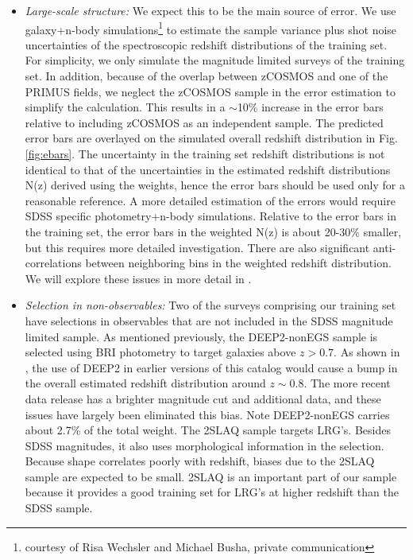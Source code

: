 \documentclass{emulateapj}
\begin{document}
\begin{itemize}

\item {\it Large-scale structure:} We expect this to be the main source of
error.  We use galaxy+n-body simulations\footnote{courtesy of Risa Wechsler and
Michael Busha, private communication} to estimate the sample variance plus shot
noise uncertainties of the spectroscopic redshift distributions of the training
set.  For simplicity, we only simulate the magnitude limited surveys of the
training set.  In addition, because of the overlap between zCOSMOS and one of
the PRIMUS fields, we neglect the zCOSMOS sample in the error estimation to
simplify the calculation.  This results in a $\sim$10\% increase in the error
bars relative to including zCOSMOS as an independent sample.  The predicted
error bars are overlayed on the simulated overall redshift distribution in Fig.
\ref{fig:ebars}.  The uncertainty in the training set redshift distributions is
not identical to that of the uncertainties in the estimated redshift
distributions N(z) derived using the weights, hence the error bars should be
used only for a reasonable reference.  A more detailed estimation of the errors
would require SDSS specific photometry+n-body simulations.  Relative to the
error bars in the training set, the error bars in the weighted N(z) is about
20-30\% smaller, but this requires more detailed investigation.  There are also
significant anti-correlations between neighboring bins in the weighted redshift
distribution.  We will explore these issues in more detail in
\citet{CunhaPhotozLSS11}.

\item {\it Selection in non-observables:} Two of the surveys comprising our
training set have selections in observables that are not included in the SDSS
magnitude limited sample.  As mentioned previously, the DEEP2-nonEGS sample is
selected using BRI photometry to target galaxies above $z>0.7$.  As shown in
\citet{CunhaPhotoz09}, the use of DEEP2 in earlier versions of this catalog
would cause a bump in the overall estimated redshift distribution around $z\sim
0.8$.  The more recent data release has a brighter magnitude cut and additional
data, and these issues have largely been eliminated this bias.  Note
DEEP2-nonEGS carries about 2.7\% of the total weight.  The 2SLAQ sample targets
LRG's.  Besides SDSS magnitudes, it also uses morphological information in the
selection.  Because shape correlates poorly with redshift, biases due to the
2SLAQ sample are expected to be small.  2SLAQ is an important part of our
sample because it provides a good training set for LRG's at higher redshift
than the SDSS sample.


\end{itemize}
\end{document}
